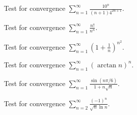 \documentclass[
  course = {{MATH102 Calculus II}},
  quartile = {{2}},
  assignment = {{Sections 11.6}},%
  topic = {{The Ratio and Root Tests}},
  firstexercise = 1,
  term = 203
]{../class/aga-homework}
\begin{document}
\newpage

\problem Test for convergence $\displaystyle \sum_{n=1}^{\infty}\frac{10^{n}}{(n+1)4^{2n+1}}$.

\newpage

\problem Test for convergence $\displaystyle \sum_{n=1}^{\infty}\frac{n!}{n^n}$.

\newpage

\problem Test for convergence $\displaystyle \sum_{n=1}^{\infty}\left(1+\frac{1}{n}\right)^{n^2}$.

\newpage

\problem Test for convergence $\displaystyle \sum_{n=1}^{\infty}\left(\arctan n\right)^n$.

\newpage

\problem Test for convergence $\displaystyle \sum_{n=1}^{\infty}\frac{\sin(n\pi/6)}{1+n\sqrt{n}}$.

\newpage

\problem Test for convergence $\displaystyle \sum_{n=2}^{\infty}\frac{(-1)^n}{\sqrt{n}\ln n}$.

\newpage
\afterpage{\null\newpage}

\afterpage{\null\newpage}

\afterpage{\null\newpage}
\end{document}
